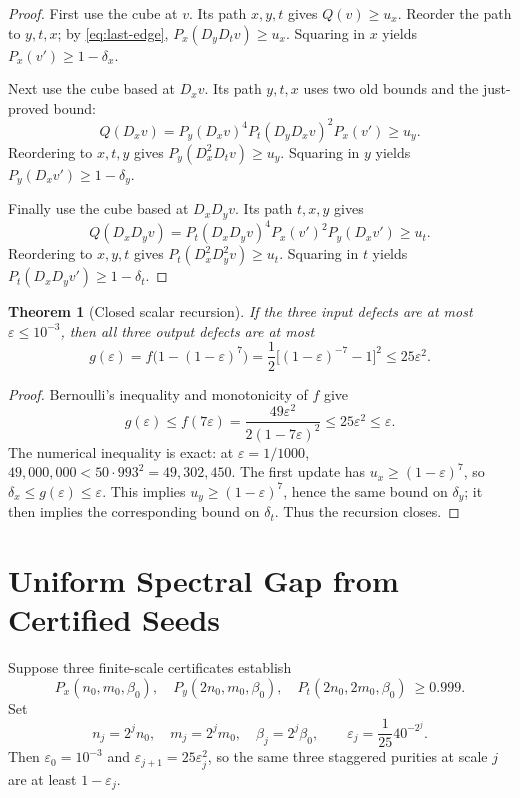 \documentclass[11pt]{article}
\newcommand{\ee}{\varepsilon}
\newtheorem{theorem}{Theorem}
\begin{document}
\begin{proof}
	First use the cube at \(v\). Its path \(x,y,t\) gives
	\(Q(v)\ge u_x\). Reorder the path to \(y,t,x\); by
	\eqref{eq:last-edge},
	\(P_x(D_yD_tv)\ge u_x\).
	Squaring in \(x\) yields \(P_x(v')\ge1-\delta_x\).

	Next use the cube based at \(D_xv\). Its path \(y,t,x\) uses two
	old bounds and the just-proved bound:
	\[
		Q(D_xv)=P_y(D_xv)^4P_t(D_yD_xv)^2P_x(v')\ge u_y.
	\]
	Reordering to \(x,t,y\) gives
	\(P_y(D_x^2D_tv)\ge u_y\).
	Squaring in \(y\) yields \(P_y(D_xv')\ge1-\delta_y\).

	Finally use the cube based at \(D_xD_yv\). Its path \(t,x,y\)
	gives
	\[
		Q(D_xD_yv)=P_t(D_xD_yv)^4P_x(v')^2P_y(D_xv')\ge u_t.
	\]
	Reordering to \(x,y,t\) gives
	\(P_t(D_x^2D_y^2v)\ge u_t\).
	Squaring in \(t\) yields \(P_t(D_xD_yv')\ge1-\delta_t\).
\end{proof}

\begin{theorem}[Closed scalar recursion]
	If the three input defects are at most \(\ee\le10^{-3}\), then all
	three output defects are at most
	\begin{equation}
		g(\ee)=f\bigl(1-(1-\ee)^7\bigr)
		=\frac12\bigl[(1-\ee)^{-7}-1\bigr]^2
		\le25\ee^2.
		\label{eq:scalar}
	\end{equation}
\end{theorem}

\begin{proof}
	Bernoulli's inequality and monotonicity of \(f\) give
	\[
		g(\ee)\le f(7\ee)
		=\frac{49\ee^2}{2(1-7\ee)^2}
		\le25\ee^2\le\ee.
	\]
	The numerical inequality is exact: at \(\ee=1/1000\),
	\(49{,}000{,}000<50\cdot993^2=49{,}302{,}450\).
	The first update has \(u_x\ge(1-\ee)^7\), so
	\(\delta_x\le g(\ee)\le\ee\).
	This implies \(u_y\ge(1-\ee)^7\), hence the same bound on
	\(\delta_y\); it then implies the corresponding bound on
	\(\delta_t\). Thus the recursion closes.
\end{proof}

\section{Uniform Spectral Gap from Certified Seeds}

Suppose three finite-scale certificates establish
\begin{equation}
	P_x(n_0,m_0,\beta_0),\quad
	P_y(2n_0,m_0,\beta_0),\quad
	P_t(2n_0,2m_0,\beta_0)\ \ge0.999.
	\label{eq:certificates}
\end{equation}
Set
\begin{equation}
	n_j=2^jn_0,\quad m_j=2^jm_0,\quad\beta_j=2^j\beta_0,
	\qquad \ee_j=\frac1{25}40^{-2^j}.
	\label{eq:scales}
\end{equation}
Then \(\ee_0=10^{-3}\) and \(\ee_{j+1}=25\ee_j^2\), so the
same three staggered purities at scale \(j\) are at least
\(1-\ee_j\).
\end{document}
